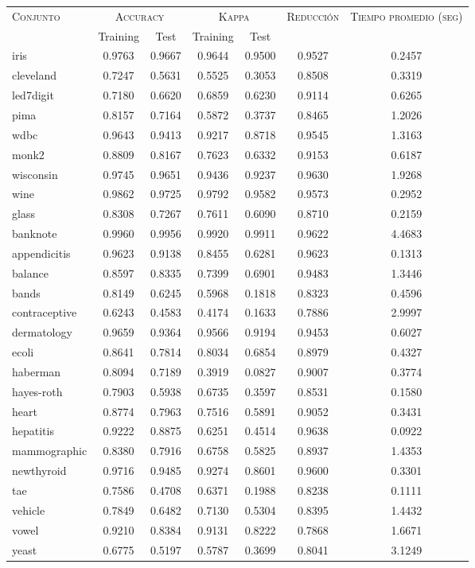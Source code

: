 \begin{table}[]
\centering
\begin{tabular}{l c c c c c c}
\hline
\multirow{2}{*}{\textsc{Conjunto}}
	& \multicolumn{2}{c}{\textsc{Accuracy}}
	& \multicolumn{2}{c}{\textsc{Kappa}}
	& \textsc{Reducción}
	& \textsc{Tiempo promedio (seg)} \\
	& Training & Test
	& Training & Test \\ 
\hline
\hline

iris & 0.9763 & 0.9667 & 0.9644 & 0.9500 & 0.9527 & 0.2457 \\
cleveland & 0.7247 & 0.5631 & 0.5525 & 0.3053 & 0.8508 & 0.3319 \\
led7digit & 0.7180 & 0.6620 & 0.6859 & 0.6230 & 0.9114 & 0.6265 \\
pima & 0.8157 & 0.7164 & 0.5872 & 0.3737 & 0.8465 & 1.2026 \\
wdbc & 0.9643 & 0.9413 & 0.9217 & 0.8718 & 0.9545 & 1.3163 \\
monk2 & 0.8809 & 0.8167 & 0.7623 & 0.6332 & 0.9153 & 0.6187 \\
wisconsin & 0.9745 & 0.9651 & 0.9436 & 0.9237 & 0.9630 & 1.9268 \\
wine & 0.9862 & 0.9725 & 0.9792 & 0.9582 & 0.9573 & 0.2952 \\
glass & 0.8308 & 0.7267 & 0.7611 & 0.6090 & 0.8710 & 0.2159 \\
banknote & 0.9960 & 0.9956 & 0.9920 & 0.9911 & 0.9622 & 4.4683 \\
appendicitis & 0.9623 & 0.9138 & 0.8455 & 0.6281 & 0.9623 & 0.1313 \\
balance & 0.8597 & 0.8335 & 0.7399 & 0.6901 & 0.9483 & 1.3446 \\
bands & 0.8149 & 0.6245 & 0.5968 & 0.1818 & 0.8323 & 0.4596 \\
contraceptive & 0.6243 & 0.4583 & 0.4174 & 0.1633 & 0.7886 & 2.9997 \\
dermatology & 0.9659 & 0.9364 & 0.9566 & 0.9194 & 0.9453 & 0.6027 \\
ecoli & 0.8641 & 0.7814 & 0.8034 & 0.6854 & 0.8979 & 0.4327 \\
haberman & 0.8094 & 0.7189 & 0.3919 & 0.0827 & 0.9007 & 0.3774 \\
hayes-roth & 0.7903 & 0.5938 & 0.6735 & 0.3597 & 0.8531 & 0.1580 \\
heart & 0.8774 & 0.7963 & 0.7516 & 0.5891 & 0.9052 & 0.3431 \\
hepatitis & 0.9222 & 0.8875 & 0.6251 & 0.4514 & 0.9638 & 0.0922 \\
mammographic & 0.8380 & 0.7916 & 0.6758 & 0.5825 & 0.8937 & 1.4353 \\
newthyroid & 0.9716 & 0.9485 & 0.9274 & 0.8601 & 0.9600 & 0.3301 \\
tae & 0.7586 & 0.4708 & 0.6371 & 0.1988 & 0.8238 & 0.1111 \\
vehicle & 0.7849 & 0.6482 & 0.7130 & 0.5304 & 0.8395 & 1.4432 \\
vowel & 0.9210 & 0.8384 & 0.9131 & 0.8222 & 0.7868 & 1.6671 \\
yeast & 0.6775 & 0.5197 & 0.5787 & 0.3699 & 0.8041 & 3.1249 \\


\end{tabular}
\end{table}
